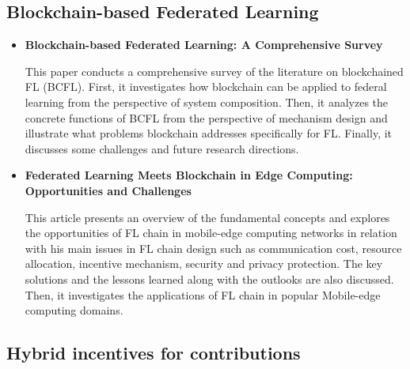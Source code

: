 \subsection{Blockchain-based Federated Learning}

\begin{frame}
\begin{itemize}
\item \textbf{Blockchain-based Federated Learning: A Comprehensive Survey\cite{wang_blockchain-based_2021}}

This paper conducts a comprehensive survey of the literature on blockchained FL (BCFL). First, it investigates how blockchain can be applied to federal learning from the perspective of system composition. Then, it analyzes the concrete functions of BCFL from the perspective of mechanism design and illustrate what problems blockchain addresses specifically for FL. Finally, it discusses some challenges and future research directions.

\item \textbf{Federated Learning Meets Blockchain in Edge Computing: Opportunities and Challenges\cite{nguyen_federated_2021}}

This article presents an overview of the fundamental concepts and explores the opportunities of FL chain in mobile-edge computing networks in relation with his main issues in FL chain design such as communication cost, resource allocation, incentive mechanism, security and privacy protection. The key solutions and the lessons learned along with the outlooks are also discussed. Then, it investigates the applications of FL chain in popular Mobile-edge computing domains.
\end{itemize}

\end{frame}

\subsection{Hybrid incentives for contributions}

